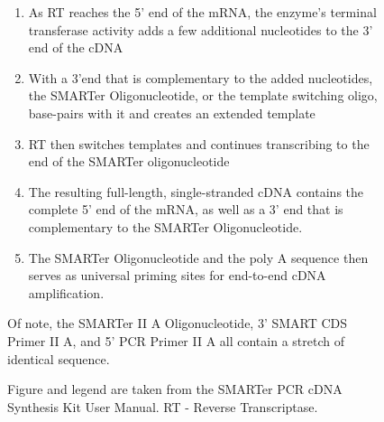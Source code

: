 \begin{figure}[htp]
{\begin{enumerate}
		\item As RT reaches the 5’ end of the mRNA, the enzyme’s terminal transferase activity adds a few additional nucleotides to the 3’ end of the cDNA
		\item With a 3’end that is complementary to the added nucleotides, the SMARTer Oligonucleotide, or the template switching oligo, base-pairs with it and creates an extended template
		\item RT then switches templates and continues transcribing to the end of the SMARTer oligonucleotide 
		\item The resulting full-length, single-stranded cDNA contains the complete 5’ end of the mRNA, as well as a 3’ end that is complementary to the SMARTer Oligonucleotide. 
		\item The SMARTer Oligonucleotide and the poly A sequence then serves as universal priming sites for end-to-end cDNA amplification.
		\\
		
	\end{enumerate}
	Of note, the SMARTer II A Oligonucleotide, 3’ SMART CDS Primer II A, and 5’ PCR Primer II A all contain a stretch of identical sequence.  

	Figure and legend are taken from the SMARTer PCR cDNA Synthesis Kit User Manual\cite{LaboratoriesInc}. RT - Reverse Transcriptase.
	}
	\label{fig:cDNAsynthesis_workflow}
\end{figure}


